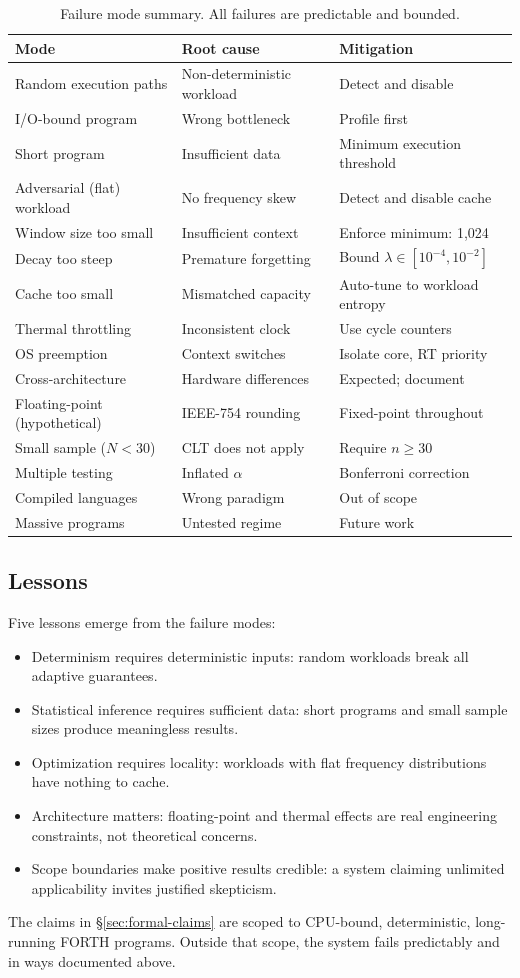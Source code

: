 \begin{table}[h]
\centering
\caption{Failure mode summary. All failures are predictable and bounded.}
\label{tab:failure-modes}
\begin{tabular}{lll}
\toprule
\textbf{Mode} & \textbf{Root cause} & \textbf{Mitigation} \\
\midrule
Random execution paths & Non-deterministic workload & Detect and disable \\
I/O-bound program & Wrong bottleneck & Profile first \\
Short program & Insufficient data & Minimum execution threshold \\
Adversarial (flat) workload & No frequency skew & Detect and disable cache \\
Window size too small & Insufficient context & Enforce minimum: 1{,}024 \\
Decay too steep & Premature forgetting & Bound $\lambda \in [10^{-4}, 10^{-2}]$ \\
Cache too small & Mismatched capacity & Auto-tune to workload entropy \\
Thermal throttling & Inconsistent clock & Use cycle counters \\
OS preemption & Context switches & Isolate core, RT priority \\
Cross-architecture & Hardware differences & Expected; document \\
Floating-point (hypothetical) & IEEE-754 rounding & Fixed-point throughout \\
Small sample ($N < 30$) & CLT does not apply & Require $n \geq 30$ \\
Multiple testing & Inflated $\alpha$ & Bonferroni correction \\
Compiled languages & Wrong paradigm & Out of scope \\
Massive programs & Untested regime & Future work \\
\bottomrule
\end{tabular}
\end{table}

\subsection{Lessons}

Five lessons emerge from the failure modes:

\begin{itemize}
  \item Determinism requires deterministic inputs: random workloads break all
    adaptive guarantees.
  \item Statistical inference requires sufficient data: short programs and
    small sample sizes produce meaningless results.
  \item Optimization requires locality: workloads with flat frequency
    distributions have nothing to cache.
  \item Architecture matters: floating-point and thermal effects are real
    engineering constraints, not theoretical concerns.
  \item Scope boundaries make positive results credible: a system claiming
    unlimited applicability invites justified skepticism.
\end{itemize}

The claims in \S\ref{sec:formal-claims} are scoped to CPU-bound, deterministic,
long-running FORTH programs. Outside that scope, the system fails
predictably and in ways documented above.
